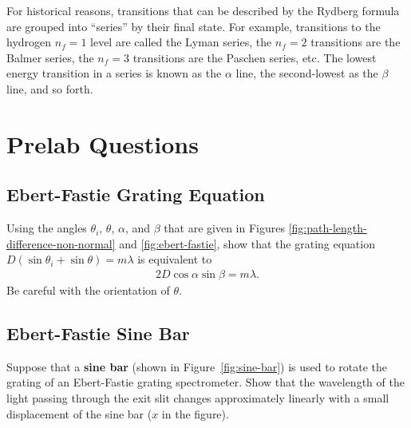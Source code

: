 \documentclass[]{manual}
\begin{document}
    For historical reasons, transitions that can be described by the Rydberg formula are grouped into ``series'' by their final state.
    For example, transitions to the hydrogen $n_f=1$ level are called the Lyman series, the $n_f=2$ transitions are the Balmer series, the $n_f=3$ transitions are the Paschen series, etc.
    The lowest energy transition in a series is known as the $\alpha$ line, the second-lowest as the $\beta$ line, and so forth.


    \FloatBarrier
    \newpage

    \section*{Prelab Questions}
    \setcounter{subsection}{0}

    \subsection{Ebert-Fastie Grating Equation}

    Using the angles $\theta_i$, $\theta$, $\alpha$, and $\beta$ that are given in Figures \ref{fig:path-length-difference-non-normal} and \ref{fig:ebert-fastie}, show that the grating equation $D(\sin\theta_i + \sin\theta) = m \lambda$ is equivalent to
    \begin{align*}
        2 D \cos\alpha \sin\beta = m \lambda.
    \end{align*}
    Be careful with the orientation of $\theta$.


    \subsection{Ebert-Fastie Sine Bar}

    Suppose that a \textbf{sine bar} (shown in Figure~\ref{fig:sine-bar}) is used to rotate the grating of an Ebert-Fastie grating spectrometer.
    Show that the wavelength of the light passing through the exit slit changes approximately linearly with a small displacement of the sine bar ($x$ in the figure).
\end{document}
